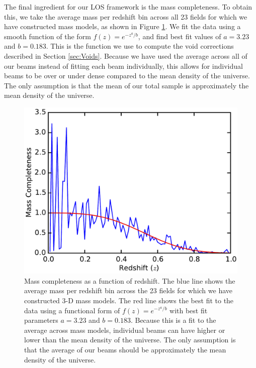\documentclass{emulateapj}
\begin{document}
The final ingredient for our LOS framework is the mass completeness. To obtain this, we take the average mass per redshift bin across all 23 fields for which we have constructed mass models, as shown in Figure \ref{fig:mass_complete}. We fit the data using a smooth function of the form $f(z) = e^{-z^a / b}$, and find best fit values of $a = 3.23$ and $b = 0.183$. This is the function we use to compute the void corrections described in Section \ref{sec:Voids}.  Because we have used the average across all of our beams instead of fitting each beam individually, this allows for individual beams to be over or under dense compared to the mean density of the universe. The only assumption is that the mean of our total sample is approximately the mean density of the universe.

\begin{figure}[t]
\begin{center}
\includegraphics[width=\textwidth]{mass_completeness.pdf}
\caption{\label{fig:mass_complete} Mass completeness as a function of redshift. The blue line shows the average mass per redshift bin across the 23 fields for which we have constructed 3-D mass models. The red line shows the best fit to the data using a functional form of $f(z) = e^{-z^a / b}$ with best fit parameters $a = 3.23$ and $b = 0.183$. Because this is a fit to the average across mass models, individual beams can have higher or lower than the mean density of the universe. The only assumption is that the average of our beams should be approximately the mean density of the universe.%
}
\end{center}
\end{figure}
\end{document}
